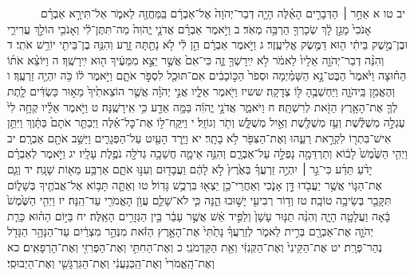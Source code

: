 \documentclass[twoside, openany, parskip=half, 11pt]{book}
\begin{document}
　　　יב טו א אַחַ֣ר ׀ הַדְּבָרִ֣ים הָאֵ֗לֶּה הָיָ֤ה דְבַר־יְהֹוָה֙ אֶל־אַבְרָ֔ם בַּֽמַּחֲזֶ֖ה לֵאמֹ֑ר אַל־תִּירָ֣א אַבְרָ֗ם אָנֹכִי֙ מָגֵ֣ן לָ֔ךְ שְׂכָרְךָ֖ הַרְבֵּ֥ה מְאֹֽד׃ ב וַיֹּ֣אמֶר אַבְרָ֗ם אֲדֹנָ֤י יֱהֹוִה֙ מַה־תִּתֶּן־לִ֔י וְאָנֹכִ֖י הוֹלֵ֣ךְ עֲרִירִ֑י וּבֶן־מֶ֣שֶׁק בֵּיתִ֔י ה֖וּא דַּמֶּ֥שֶׂק אֱלִיעֶֽזֶר׃ ג וַיֹּ֣אמֶר אַבְרָ֔ם הֵ֣ן לִ֔י לֹ֥א נָתַ֖תָּה זָ֑רַע וְהִנֵּ֥ה בֶן־בֵּיתִ֖י יוֹרֵ֥שׁ אֹתִֽי׃ ד וְהִנֵּ֨ה דְבַר־יְהֹוָ֤ה אֵלָיו֙ לֵאמֹ֔ר לֹ֥א יִֽירָשְׁךָ֖ זֶ֑ה כִּי־אִם֙ אֲשֶׁ֣ר יֵצֵ֣א מִמֵּעֶ֔יךָ ה֖וּא יִֽירָשֶֽׁךָ׃ ה וַיּוֹצֵ֨א אֹת֜וֹ הַח֗וּצָה וַיֹּ֙אמֶר֙ הַבֶּט־נָ֣א הַשָּׁמַ֗יְמָה וּסְפֹר֙ הַכּ֣וֹכָבִ֔ים אִם־תּוּכַ֖ל לִסְפֹּ֣ר אֹתָ֑ם וַיֹּ֣אמֶר ל֔וֹ כֹּ֥ה יִהְיֶ֖ה זַרְעֶֽךָ׃ ו וְהֶאֱמִ֖ן בַּֽיהֹוָ֑ה וַיַּחְשְׁבֶ֥הָ לּ֖וֹ צְדָקָֽה׃ ששיז וַיֹּ֖אמֶר אֵלָ֑יו אֲנִ֣י יְהֹוָ֗ה אֲשֶׁ֤ר הוֹצֵאתִ֙יךָ֙ מֵא֣וּר כַּשְׂדִּ֔ים לָ֧תֶת לְךָ֛ אֶת־הָאָ֥רֶץ הַזֹּ֖את לְרִשְׁתָּֽהּ׃ ח וַיֹּאמַ֑ר אֲדֹנָ֣י יֱהֹוִ֔ה בַּמָּ֥ה אֵדַ֖ע כִּ֥י אִֽירָשֶֽׁנָּה׃ ט וַיֹּ֣אמֶר אֵלָ֗יו קְחָ֥ה לִי֙ עֶגְלָ֣ה מְשֻׁלֶּ֔שֶׁת וְעֵ֥ז מְשֻׁלֶּ֖שֶׁת וְאַ֣יִל מְשֻׁלָּ֑שׁ וְתֹ֖ר וְגוֹזָֽל׃ י וַיִּֽקַּֽח־ל֣וֹ אֶת־כׇּל־אֵ֗לֶּה וַיְבַתֵּ֤ר אֹתָם֙ בַּתָּ֔וֶךְ וַיִּתֵּ֥ן אִישׁ־בִּתְר֖וֹ לִקְרַ֣את רֵעֵ֑הוּ וְאֶת־הַצִּפֹּ֖ר לֹ֥א בָתָֽר׃ יא וַיֵּ֥רֶד הָעַ֖יִט עַל־הַפְּגָרִ֑ים וַיַּשֵּׁ֥ב אֹתָ֖ם אַבְרָֽם׃ יב וַיְהִ֤י הַשֶּׁ֙מֶשׁ֙ לָב֔וֹא וְתַרְדֵּמָ֖ה נָפְלָ֣ה עַל־אַבְרָ֑ם וְהִנֵּ֥ה אֵימָ֛ה חֲשֵׁכָ֥ה גְדֹלָ֖ה נֹפֶ֥לֶת עָלָֽיו׃ יג וַיֹּ֣אמֶר לְאַבְרָ֗ם יָדֹ֨עַ תֵּדַ֜ע כִּי־גֵ֣ר ׀ יִהְיֶ֣ה זַרְעֲךָ֗ בְּאֶ֙רֶץ֙ לֹ֣א לָהֶ֔ם וַעֲבָד֖וּם וְעִנּ֣וּ אֹתָ֑ם אַרְבַּ֥ע מֵא֖וֹת שָׁנָֽה׃ יד וְגַ֧ם אֶת־הַגּ֛וֹי אֲשֶׁ֥ר יַעֲבֹ֖דוּ דָּ֣ן אָנֹ֑כִי וְאַחֲרֵי־כֵ֥ן יֵצְא֖וּ בִּרְכֻ֥שׁ גָּדֽוֹל׃ טו וְאַתָּ֛ה תָּב֥וֹא אֶל־אֲבֹתֶ֖יךָ בְּשָׁל֑וֹם תִּקָּבֵ֖ר בְּשֵׂיבָ֥ה טוֹבָֽה׃ טז וְד֥וֹר רְבִיעִ֖י יָשׁ֣וּבוּ הֵ֑נָּה כִּ֧י לֹא־שָׁלֵ֛ם עֲוֺ֥ן הָאֱמֹרִ֖י עַד־הֵֽנָּה׃ יז וַיְהִ֤י הַשֶּׁ֙מֶשׁ֙ בָּ֔אָה וַעֲלָטָ֖ה הָיָ֑ה וְהִנֵּ֨ה תַנּ֤וּר עָשָׁן֙ וְלַפִּ֣יד אֵ֔שׁ אֲשֶׁ֣ר עָבַ֔ר בֵּ֖ין הַגְּזָרִ֥ים הָאֵֽלֶּה׃ יח בַּיּ֣וֹם הַה֗וּא כָּרַ֧ת יְהֹוָ֛ה אֶת־אַבְרָ֖ם בְּרִ֣ית לֵאמֹ֑ר לְזַרְעֲךָ֗ נָתַ֙תִּי֙ אֶת־הָאָ֣רֶץ הַזֹּ֔את מִנְּהַ֣ר מִצְרַ֔יִם עַד־הַנָּהָ֥ר הַגָּדֹ֖ל נְהַר־פְּרָֽת׃ יט אֶת־הַקֵּינִי֙ וְאֶת־הַקְּנִזִּ֔י וְאֵ֖ת הַקַּדְמֹנִֽי׃ כ וְאֶת־הַחִתִּ֥י וְאֶת־הַפְּרִזִּ֖י וְאֶת־הָרְפָאִֽים׃ כא וְאֶת־הָֽאֱמֹרִי֙ וְאֶת־הַֽכְּנַעֲנִ֔י וְאֶת־הַגִּרְגָּשִׁ֖י וְאֶת־הַיְבוּסִֽי׃
\end{document}
